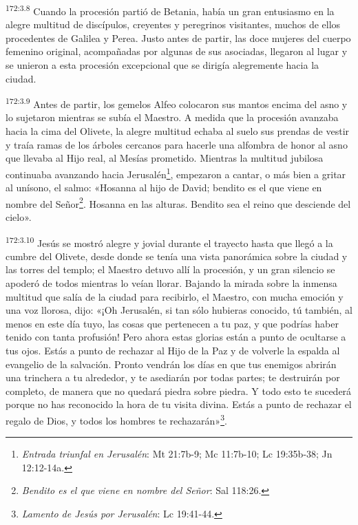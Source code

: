 \par
\textsuperscript{172:3.8} Cuando la procesión partió de Betania, había un gran entusiasmo en la alegre multitud de discípulos, creyentes y peregrinos visitantes, muchos de ellos procedentes de Galilea y Perea. Justo antes de partir, las doce mujeres del cuerpo femenino original, acompañadas por algunas de sus asociadas, llegaron al lugar y se unieron a esta procesión excepcional que se dirigía alegremente hacia la ciudad.

\par
\textsuperscript{172:3.9} Antes de partir, los gemelos Alfeo colocaron sus mantos encima del asno y lo sujetaron mientras se subía el Maestro. A medida que la procesión avanzaba hacia la cima del Olivete, la alegre multitud echaba al suelo sus prendas de vestir y traía ramas de los árboles cercanos para hacerle una alfombra de honor al asno que llevaba al Hijo real, al Mesías prometido. Mientras la multitud jubilosa continuaba avanzando hacia Jerusalén\footnote{\textit{Entrada triunfal en Jerusalén}: Mt 21:7b-9; Mc 11:7b-10; Lc 19:35b-38; Jn 12:12-14a.}, empezaron a cantar, o más bien a gritar al unísono, el salmo: «Hosanna al hijo de David; bendito es el que viene en nombre del Señor\footnote{\textit{Bendito es el que viene en nombre del Señor}: Sal 118:26.}. Hosanna en las alturas. Bendito sea el reino que desciende del cielo».

\par
\textsuperscript{172:3.10} Jesús se mostró alegre y jovial durante el trayecto hasta que llegó a la cumbre del Olivete, desde donde se tenía una vista panorámica sobre la ciudad y las torres del templo; el Maestro detuvo allí la procesión, y un gran silencio se apoderó de todos mientras lo veían llorar. Bajando la mirada sobre la inmensa multitud que salía de la ciudad para recibirlo, el Maestro, con mucha emoción y una voz llorosa, dijo: «¡Oh Jerusalén, si tan sólo hubieras conocido, tú también, al menos en este día tuyo, las cosas que pertenecen a tu paz, y que podrías haber tenido con tanta profusión! Pero ahora estas glorias están a punto de ocultarse a tus ojos. Estás a punto de rechazar al Hijo de la Paz y de volverle la espalda al evangelio de la salvación. Pronto vendrán los días en que tus enemigos abrirán una trinchera a tu alrededor, y te asediarán por todas partes; te destruirán por completo, de manera que no quedará piedra sobre piedra. Y todo esto te sucederá porque no has reconocido la hora de tu visita divina. Estás a punto de rechazar el regalo de Dios, y todos los hombres te rechazarán»\footnote{\textit{Lamento de Jesús por Jerusalén}: Lc 19:41-44.}.

